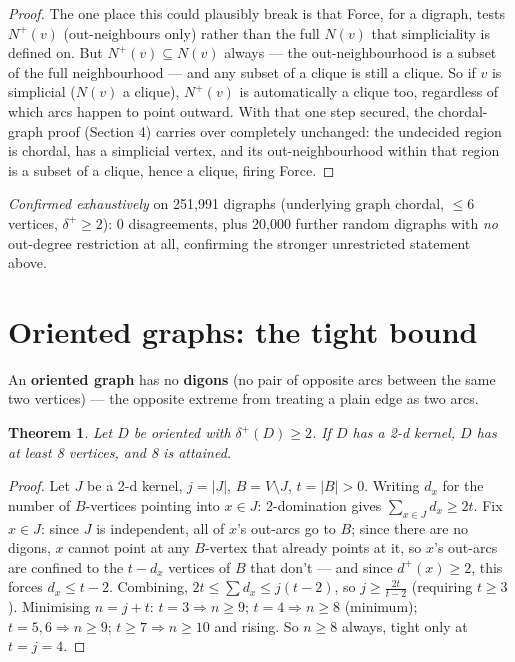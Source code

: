 \documentclass[11pt]{article}
\theoremstyle{plain}
\newtheorem{theorem}{Theorem}
\theoremstyle{definition}
\theoremstyle{remark}
\begin{document}
\begin{proof}
The one place this could plausibly break is that Force, for a digraph, tests
$N^+(v)$ (out-neighbours only) rather than the full $N(v)$ that simpliciality is
defined on. But $N^+(v)\subseteq N(v)$ always — the out-neighbourhood is a subset of
the full neighbourhood — and any subset of a clique is still a clique. So if $v$ is
simplicial ($N(v)$ a clique), $N^+(v)$ is automatically a clique too, regardless of
which arcs happen to point outward. With that one step secured, the chordal-graph
proof (Section 4) carries over completely unchanged: the undecided region is chordal,
has a simplicial vertex, and its out-neighbourhood within that region is a subset of
a clique, hence a clique, firing Force.
\end{proof}

\emph{Confirmed exhaustively} on 251{,}991 digraphs (underlying graph chordal, $\le6$
vertices, $\delta^+\ge2$): 0 disagreements, plus 20{,}000 further random digraphs with
\emph{no} out-degree restriction at all, confirming the stronger unrestricted
statement above.

\section{Oriented graphs: the tight bound}

An \textbf{oriented graph} has no \textbf{digons} (no pair of opposite arcs between
the same two vertices) — the opposite extreme from treating a plain edge as two
arcs.

\begin{theorem}
Let $D$ be oriented with $\delta^+(D)\ge2$. If $D$ has a 2-d kernel, $D$ has at least
8 vertices, and 8 is attained.
\end{theorem}

\begin{proof}
Let $J$ be a 2-d kernel, $j=|J|$, $B=V\setminus J$, $t=|B|>0$. Writing $d_x$ for the
number of $B$-vertices pointing into $x\in J$: 2-domination gives
$\sum_{x\in J}d_x\ge2t$. Fix $x\in J$: since $J$ is independent, all of $x$'s
out-arcs go to $B$; since there are no digons, $x$ cannot point at any $B$-vertex
that already points at it, so $x$'s out-arcs are confined to the $t-d_x$ vertices of
$B$ that don't — and since $d^+(x)\ge2$, this forces $d_x\le t-2$. Combining,
$2t\le\sum d_x\le j(t-2)$, so $j\ge\frac{2t}{t-2}$ (requiring $t\ge3$). Minimising
$n=j+t$: $t=3\Rightarrow n\ge9$; $t=4\Rightarrow n\ge8$ (minimum); $t=5,6\Rightarrow
n\ge9$; $t\ge7\Rightarrow n\ge10$ and rising. So $n\ge8$ always, tight only at
$t=j=4$.
\end{proof}
\end{document}
